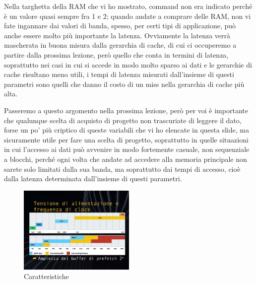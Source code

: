 Nella targhetta della RAM che vi ho mostrato, command non era indicato perché è un valore quasi sempre fra 1 e 2; quando andate a comprare delle RAM, non vi fate ingannare dai valori di banda, spesso, per certi tipi di applicazione, può anche essere molto più importante la latenza.
Ovviamente la latenza verrà mascherata in buona misura dalla gerarchia di cache, di cui ci occuperemo a partire dalla prossima lezione, però quello che conta in termini di latenza, soprattutto nei casi in cui si accede in modo molto sparso ai dati e le gerarchie di cache risultano meno utili, i tempi di latenza misurati dall'insieme di questi parametri sono quelli che danno il costo di un miss nella gerarchia di cache più alta.

Passeremo a questo argomento nella prossima lezione, però per voi è importante che qualunque scelta di acquisto di progetto non trascuriate di leggere il dato, forse un po' più criptico di queste variabili che vi ho elencate in questa slide, ma sicuramente utile per fare una scelta di progetto, soprattutto in quelle situazioni in cui l'accesso ai dati può avvenire in modo fortemente casuale, non sequenziale a blocchi, perché ogni volta che andate ad accedere alla memoria principale non sarete solo limitati dalla sua banda, ma soprattutto dai tempi di accesso, cioè dalla latenza determinata dall'insieme di questi parametri.

\FloatBarrier
\begin{figure}[H]
  \centering
  \includegraphics[width=0.50\textwidth,
                    trim=0 40 0 40, %
                    clip]
                    {images/Lez05_p02_fig_03.png}
  \caption{Caratteristiche}
  \label{fig:Lez05_p02_fig_03}
\end{figure}
\FloatBarrier
\noindent

